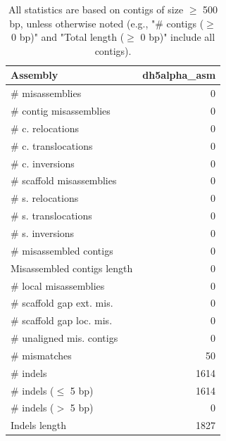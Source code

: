 \documentclass[12pt,a4paper]{article}
\begin{document}
\begin{table}[ht]
\begin{center}
\caption{All statistics are based on contigs of size $\geq$ 500 bp, unless otherwise noted (e.g., "\# contigs ($\geq$ 0 bp)" and "Total length ($\geq$ 0 bp)" include all contigs).}
\begin{tabular}{|l*{1}{|r}|}
\hline
Assembly & dh5alpha\_asm \\ \hline
\# misassemblies & 0 \\ \hline
\hspace{2mm}\# contig misassemblies & 0 \\ \hline
\hspace{5mm}\# c. relocations & 0 \\ \hline
\hspace{5mm}\# c. translocations & 0 \\ \hline
\hspace{5mm}\# c. inversions & 0 \\ \hline
\hspace{2mm}\# scaffold misassemblies & 0 \\ \hline
\hspace{5mm}\# s. relocations & 0 \\ \hline
\hspace{5mm}\# s. translocations & 0 \\ \hline
\hspace{5mm}\# s. inversions & 0 \\ \hline
\# misassembled contigs & 0 \\ \hline
Misassembled contigs length & 0 \\ \hline
\# local misassemblies & 0 \\ \hline
\# scaffold gap ext. mis. & 0 \\ \hline
\# scaffold gap loc. mis. & 0 \\ \hline
\# unaligned mis. contigs & 0 \\ \hline
\# mismatches & 50 \\ \hline
\# indels & 1614 \\ \hline
\hspace{5mm}\# indels ($\leq$ 5 bp) & 1614 \\ \hline
\hspace{5mm}\# indels ($>$ 5 bp) & 0 \\ \hline
Indels length & 1827 \\ \hline
\end{tabular}
\end{center}
\end{table}
\end{document}
